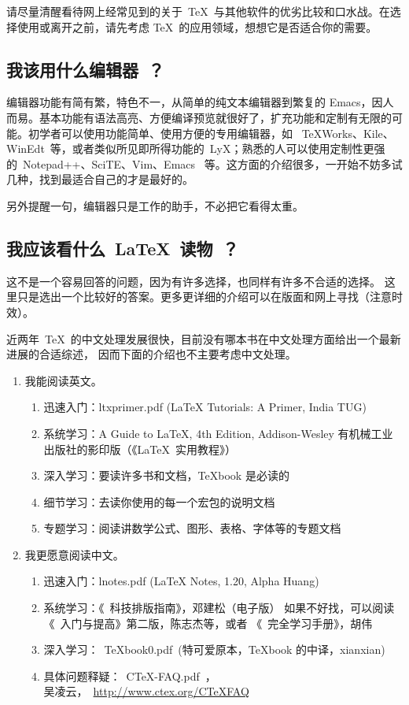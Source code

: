 请尽量清醒看待网上经常见到的关于~\TeX~与其他软件的优劣比较和口水战。在选择使用或离开之前，请先考虑
\TeX~的应用领域，想想它是否适合你的需要。


\subsection{我该用什么编辑器~？}

编辑器功能有简有繁，特色不一，从简单的纯文本编辑器到繁复的 Emacs，因人而易。基本功能有语法高亮、方便编译预览就很好了，扩充功能和定制有无限的可能。初学者可以使用功能简单、使用方便的专用编辑器，如 ~TeXWorks、Kile、WinEdt~等，或者类似所见即所得功能的~LyX；熟悉的人可以使用定制性更强的~Notepad++、SciTE、Vim、Emacs ~等。这方面的介绍很多，一开始不妨多试几种，找到最适合自己的才是最好的。

另外提醒一句，编辑器只是工作的助手，不必把它看得太重。

\subsection{我应该看什么~\LaTeX~读物~？}

这不是一个容易回答的问题，因为有许多选择，也同样有许多不合适的选择。
这里只是选出一个比较好的答案。更多更详细的介绍可以在版面和网上寻找（注意时效）。

近两年~\TeX~的中文处理发展很快，目前没有哪本书在中文处理方面给出一个最新进展的合适综述，
因而下面的介绍也不主要考虑中文处理。

\begin{enumerate}

\item 我能阅读英文。
\begin{enumerate}
\item 迅速入门：ltxprimer.pdf (LaTeX Tutorials: A Primer, India TUG)
\item 系统学习：A Guide to LaTeX, 4th Edition, Addison-Wesley
               有机械工业出版社的影印版（《\LaTeX{}~实用教程》）
\item 深入学习：要读许多书和文档，TeXbook 是必读的
\item 细节学习：去读你使用的每一个宏包的说明文档
\item 专题学习：阅读讲数学公式、图形、表格、字体等的专题文档
\end{enumerate}

\item 我更愿意阅读中文。
\begin{enumerate}
\item 迅速入门：lnotes.pdf (LaTeX Notes, 1.20, Alpha Huang)
\item 系统学习：《\LaTeXe{}~科技排版指南》，邓建松（电子版）
      如果不好找，可以阅读《\LaTeXe~入门与提高》第二版，陈志杰等，或者 《\LaTeXe~完全学习手册》，胡伟
\item 深入学习：~TeXbook0.pdf~(特可爱原本，TeXbook 的中译，xianxian)
\item 具体问题释疑：~CTeX-FAQ.pdf~，\\
        吴凌云，~\url{http://www.ctex.org/CTeXFAQ}~
\end{enumerate}
\end{enumerate}

